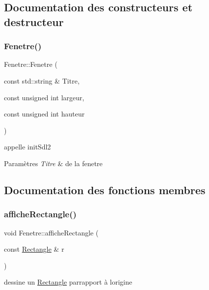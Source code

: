 \subsection{Documentation des constructeurs et destructeur}
\mbox{\label{class_fenetre_a532a304e0c331e9e9fad1fe8b4218a96}} 
\subsubsection{\texorpdfstring{Fenetre()}{Fenetre()}}
{\footnotesize\ttfamily Fenetre\+::\+Fenetre (\begin{DoxyParamCaption}\item[{const std\+::string \&}]{Titre,  }\item[{const unsigned int}]{largeur,  }\item[{const unsigned int}]{hauteur }\end{DoxyParamCaption})}



appelle init\+Sdl2 


\begin{DoxyParams}{Paramètres}
{\em Titre} & de la fenetre \\
\hline
\end{DoxyParams}


\subsection{Documentation des fonctions membres}
\mbox{\label{class_fenetre_ada8b47211931bbcd96d90a6951b6ac81}} 
\subsubsection{\texorpdfstring{affiche\+Rectangle()}{afficheRectangle()}}
{\footnotesize\ttfamily void Fenetre\+::affiche\+Rectangle (\begin{DoxyParamCaption}\item[{const \mbox{\hyperlink{class_rectangle}{Rectangle}} \&}]{r }\end{DoxyParamCaption})}

dessine un \mbox{\hyperlink{class_rectangle}{Rectangle}} parrapport à l\textquotesingle{}origine \mbox{\label{class_fenetre_a38f16af5be9a0283ab14dec00a8b5b9e}} 
